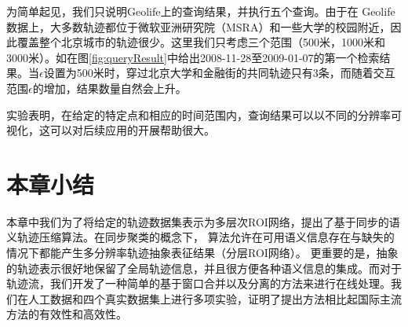 为简单起见，我们只说明Geolife上的查询结果，并执行五个查询。由于在 Geolife数据上，大多数轨迹都位于微软亚洲研究院（MSRA）和一些大学的校园附近，因此覆盖整个北京城市的轨迹很少。这里我们只考虑三个范围（500米，1000米和3000米）。如在图\ref{fig:queryResult}中给出2008-11-28至2009-01-07的第一个检索结果。当$\epsilon$设置为500米时，穿过北京大学和金融街的共同轨迹只有3条，而随着交互范围$ \epsilon $的增加，结果数量自然会上升。

实验表明，在给定的特定点和相应的时间范围内，查询结果可以以不同的分辨率可视化，这可以对后续应用的开展帮助很大。


\section{本章小结}
本章中我们为了将给定的轨迹数据集表示为多层次ROI网络，提出了基于同步的语义轨迹压缩算法\CascadeSync。在同步聚类的概念下，\CascadeSync
算法允许在可用语义信息存在与缺失的情况下都能产生多分辨率轨迹抽象表征结果（分层ROI网络）。 更重要的是，抽象的轨迹表示很好地保留了全局轨迹信息，并且很方便各种语义信息的集成。而对于轨迹流，我们开发了一种简单的基于窗口合并以及分离的方法来进行在线处理。我们在人工数据和四个真实数据集上进行多项实验，证明了提出方法相比起国际主流方法的有效性和高效性。
\newpage\mbox{}\thispagestyle{empty}\newpage
